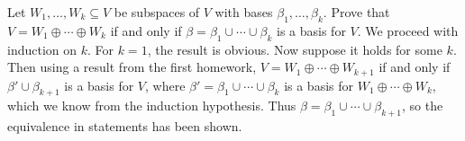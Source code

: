 \documentclass{eh-homework}
\begin{document}
    \newpage
    \begin{question}{10}
    Let $W_1, \ldots, W_k \subseteq V$ be subspaces of \(V\) with bases $\beta_1, \ldots, \beta_k$. Prove that $V = W_1 \oplus \cdots \oplus W_k$ if and only if $\beta = \beta_1 \cup \cdots \cup \beta_k$ is a basis for $V$.
    \tcblower
    We proceed with induction on \(k\). For \(k = 1\), the result is obvious. Now suppose it holds for some \(k\). Then using a result from the first homework, \(V = W_1 \oplus \cdots \oplus W_{k+1}\) if and only if \(\beta ' \cup \beta_{k+1}\) is a basis for \(V\), where \(\beta ' = \beta _1 \cup \cdots \cup \beta _k\) is a basis for \(W_1 \oplus \cdots \oplus W_k\), which we know from the induction hypothesis. Thus \(\beta = \beta _1 \cup \cdots \cup \beta _{k+1}\), so the equivalence in statements has been shown.
    \end{question}
    \newpage
\end{document}
